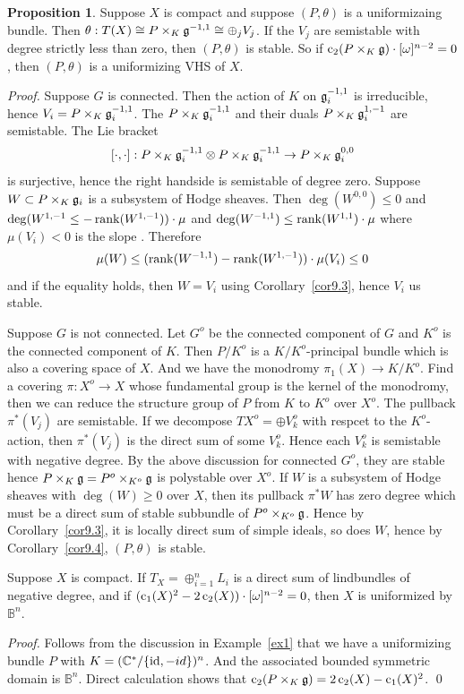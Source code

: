 \documentclass[aspectratio=169, 10pt]{beamer}
\theoremstyle{definition}
\theoremstyle{example}
\newtheorem{proposition}[theorem]{Proposition}
\begin{document}
	\begin{frame}[allowframebreaks]
		\begin{proposition}\label{prop9.6}
			Suppose $X$ is compact and suppose $(P,\theta)$ is a uniformizaing bundle. Then $\theta: T(X)\cong P\times_K \mathfrak{g}^{-1,1}\cong \oplus_j V_j$. If the $V_j$ are semistable with degree strictly less than zero, then $(P,\theta)$ is stable. So if $\operatorname{c}_2(P\times_K \mathfrak{g})\cdot [\omega]^{n-2}=0$, then $(P,\theta)$ is a uniformizing VHS of $X$.	
		\end{proposition}
		\textit{Proof.}
		Suppose $G$ is connected. Then the action of $K$ on $\mathfrak{g}_i^{-1,1}$ is irreducible, hence $V_i=P\times_K \mathfrak{g}_i^{-1,1}$. The $P\times_K \mathfrak{g}_i^{-1,1}$ and their duals $P\times_K \mathfrak{g}_i^{1,-1}$ are semistable. The Lie bracket \[ [\cdot,\cdot]: P\times_K \mathfrak{g}_i^{-1,1}\otimes P\times_K \mathfrak{g}_i^{-1,1}\to P\times_K \mathfrak{g}_i^{0,0}\] is surjective, hence the right handside is semistable of degree zero. Suppose $W\subset P\times_K \mathfrak{g}_i$ is a subsystem of Hodge sheaves. Then $\deg(W^{0,0})\leq 0$ and $\deg(W^{1,-1}\leq -\operatorname{rank}(W^{1,-1}))\cdot \mu$ and $\deg(W^{-1,1})\leq \operatorname{rank}(W^{1,1})\cdot \mu$ where $\mu(V_i)<0$ is the slope . Therefore
		\[
		\mu(W)\leq (\operatorname{rank}(W^{-1,1})-\operatorname{rank}(W^{1,-1}))\cdot \mu(V_i)\leq 0
		\]
		and if the equality holds, then $W=V_i$ using Corollary~\ref{cor9.3}, hence $V_i$ us stable.

		Suppose $G$ is not connected. Let $G^o$ be the connected component of $G$ and $K^o$ is the connected component of $K$. Then $P/K^o$ is a $K/K^o$-principal bundle which is also a covering space of $X$. And we have the monodromy $\pi_1(X)\to K/K^o$. Find a covering $\pi:X^o\to X$  whose fundamental group is the kernel of the monodromy, then we can reduce the structure group of $P$ from $K$ to $K^o$ over $X^o$. The pullback $\pi^*(V_j)$ are semistable. If we decompose $TX^o=\oplus V_k^o$ with respcet to the $K^o$-action, then $\pi^*(V_j)$ is the direct sum of some $V_k^o$. Hence each $V_k^o$ is semistable with negative degree. By the above discussion for connected $G^o$, they are stable hence $P\times_K \mathfrak{g}=P^o\times_{K^o} \mathfrak{g}$ is polystable over $X^o$. If $W$ is a subsystem of Hodge sheaves with $\deg(W)\geq 0$ over $X$, then its pullback $\pi^*W$ has zero degree which must be a direct sum of stable subbundle of $P^o\times_{K^o} \mathfrak{g}$. Hence by Corollary~\ref{cor9.3}, it is locally direct sum of simple ideals, so does $W$, hence by Corollary~\ref{cor9.4}, $(P,\theta)$ is stable.
	\end{frame}
	\begin{frame}
		\begin{corollary}\label{cor9.7}
			Suppose $X$ is compact. If $T_X=\oplus_{i=1}^{n}L_i$ is a direct sum of lindbundles of negative degree, and if $(\operatorname{c}_1(X)^2-2\operatorname{c}_2(X))\cdot [\omega]^{n-2}=0$, then $X$ is uniformized by $\mathbb{B}^n$.
		\end{corollary}
		\textit{Proof.}
		Follows from the discussion in Example~\ref{ex1} that we have a uniformizing bundle $P$ with $K=(\mathbb{C}^*/\{\mathrm{id},-id\})^n$. And the associated bounded symmetric domain is $\mathbb{B}^n$. Direct calculation shows that $\operatorname{c}_2(P \times_K \mathfrak{g})=2\operatorname{c}_2(X)-\operatorname{c}_1(X)^2$. \hfill \qed
	\end{frame}
\end{document}
